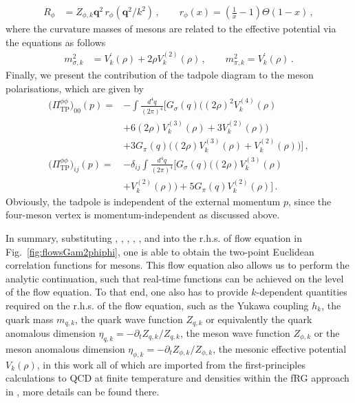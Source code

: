 \documentclass[reprint,english,superscriptaddress,preprintnumbers,amsmath,amssymb,aps,prd,nofootinbib]{revtex4-2}
\def\Fig#1{Fig.~\ref{#1}}
\begin{document}
%
\begin{align}
  R_{\phi}&=Z_{\phi,k} \boldsymbol{q}^2\,r_{\phi}(\boldsymbol{q}^2/k^2)\,,\quad \quad r_{\phi}(x)=\left(\frac{1}{x}-1\right)\Theta(1-x)\,,\label{eq:Rphi}
\end{align}
%
where the curvature masses of mesons are related to the effective potential via the equations as follows
%
\begin{align}
  m_{\sigma,k}^2&=V_k^{\prime}(\rho)+2\rho V_k^{(2)}(\rho)\,,\quad \quad m_{\pi,k}^2=V_k^{\prime}(\rho)\,.
\end{align}
Finally, we present the contribution of the tadpole diagram to the meson polarisations, which are given by
%
\begin{align}
\nonumber
  \big(\Pi^{\phi\phi}_{\mathrm{TP}}\big)_{00}(p)=&-\int \frac{d^4 q}{(2\pi)^4} \Big[ G_{\sigma}(q)\Big( (2\rho)^2V_k^{(4)}(\rho)\\
  \nonumber
  &+6 (2\rho) V_k^{(3)}(\rho)+3 V_k^{(2)}(\rho)\Big)\\
  &+3 G_{\pi}(q)\Big( (2\rho) V_k^{(3)}(\rho)+V_k^{(2)}(\rho)\Big)\Big]\,,\label{eq:Pisigma-TP}\\[2ex]
  \nonumber
  \big(\Pi^{\phi\phi}_{\mathrm{TP}}\big)_{ij}(p)=&-\delta_{ij} \int \frac{d^4 q}{(2\pi)^4}\Big[ G_{\sigma}(q)\Big( (2\rho) V_k^{(3)}(\rho)\\
  &+V_k^{(2)}(\rho)\Big)+5 G_{\pi}(q)V_k^{(2)}(\rho)\Big]\,.\label{eq:Pipi-TP}
\end{align}
%
Obviously, the tadpole is independent of the external momentum $p$, since the four-meson vertex is momentum-independent as discussed above.

In summary, substituting , , , , , and  into the r.h.s. of flow equation in \Fig{fig:flowsGam2phiphi}, one is able to obtain the two-point Euclidean correlation functions for mesons. 
This flow equation also allows us to perform the analytic continuation, such that real-time functions can be achieved on the level of the flow equation. 
To that end, one also has to provide $k$-dependent quantities required on the r.h.s. of the flow equation, such as the Yukawa coupling $h_k$, the quark mass $m_{q,k}$, the quark wave function $Z_{q,k}$ or equivalently the quark anomalous dimension $\eta_{q,k}=-\partial_t Z_{q,k}/Z_{q,k}$, the meson wave function $Z_{\phi,k}$ or the meson anomalous dimension $\eta_{\phi,k}=-\partial_t Z_{\phi,k}/Z_{\phi,k}$, the mesonic effective potential $V_k(\rho)$, in this work all of which are imported from the first-principles calculations to QCD at finite temperature and densities within the fRG approach in \cite{Fu:2019hdw}, more details can be found there.
\end{document}
